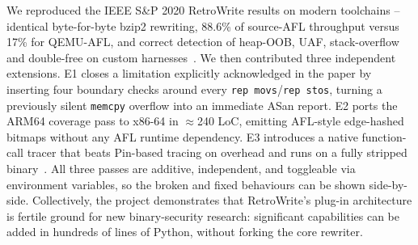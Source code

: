 \documentclass[10pt,a4paper]{article}
\begin{document}
We reproduced the IEEE S\&P 2020 RetroWrite results on modern toolchains --
identical byte-for-byte bzip2 rewriting, 88.6\% of source-AFL throughput
versus 17\% for QEMU-AFL, and correct detection of heap-OOB, UAF,
stack-overflow and double-free on custom harnesses~\cite{retrowrite,afl,asan}.
We then contributed three independent extensions. E1 closes a limitation
explicitly acknowledged in the paper by inserting four boundary checks around
every \texttt{rep movs}/\texttt{rep stos}, turning a previously silent
\texttt{memcpy} overflow into an immediate ASan report. E2 ports the ARM64
coverage pass to x86-64 in $\approx$240 LoC, emitting AFL-style
edge-hashed bitmaps without any AFL runtime dependency. E3 introduces a
native function-call tracer that beats Pin-based tracing on overhead and
runs on a fully stripped binary~\cite{pin}. All three passes are additive,
independent, and toggleable via environment variables, so the broken and
fixed behaviours can be shown side-by-side. Collectively, the project
demonstrates that RetroWrite's plug-in architecture is fertile ground for
new binary-security research: significant capabilities can be added in
hundreds of lines of Python, without forking the core rewriter.
\end{document}
